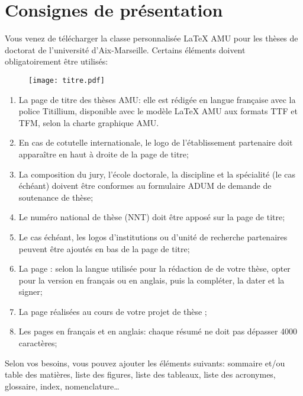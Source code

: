 \chapter{Consignes de présentation}
\label{chap:consignes}

Vous venez de télécharger la classe personnalisée LaTeX AMU pour les thèses de doctorat de l'université d'Aix-Marseille.
Certains éléments doivent obligatoirement être utilisés:
\\


\begin{figure}[h!tbp]
	\centering
	\texttt{[image: titre.pdf]}
\end{figure}

\begin{enumerate}
	\item La page de titre des thèses AMU: elle est rédigée en langue française avec la police Titillium, disponible avec le modèle LaTeX AMU aux formats TTF et TFM, selon la charte graphique AMU.
	\item En cas de cotutelle internationale, le logo de l’établissement partenaire doit apparaître en haut à droite de la page de titre;
	\item La composition du jury, l’école doctorale, la discipline et la spécialité (le cas échéant) doivent être conformes au formulaire ADUM de demande de soutenance de thèse;
	\item Le numéro national de thèse (NNT) doit être apposé sur la page de titre;
	\item Le cas échéant, les logos d’institutions ou d’unité de recherche partenaires peuvent être ajoutés en bas de la page de titre;
	\item La page : selon la langue utilisée pour la rédaction de de votre thèse, opter pour la version en français ou en anglais, puis la compléter, la dater et la signer;
	\item La page  réalisées au cours de votre projet de thèse ;
	\item Les pages  en français et  en anglais: chaque résumé ne doit pas dépasser 4000 caractères;
\end{enumerate}

Selon vos besoins, vous pouvez ajouter les éléments suivants: sommaire et/ou table des matières, liste des figures, liste des tableaux, liste des acronymes, glossaire, index, nomenclature…

